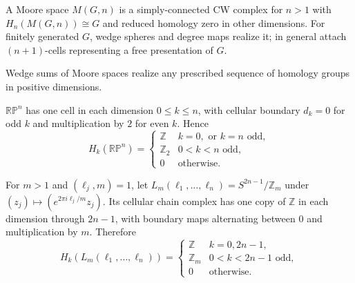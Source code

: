 \begin{example}
\label{ex:moore-spaces}

A Moore space $M(G,n)$ is a simply-connected CW complex for $n>1$ with $H_n(M(G,n))\cong G$ and reduced homology zero in other dimensions.  For finitely generated $G$, wedge spheres and degree maps realize it; in general attach $(n+1)$-cells representing a free presentation of $G$.
\end{example}

\begin{example}
\label{ex:cellular-homology-cpn}

Wedge sums of Moore spaces realize any prescribed sequence of homology groups in positive dimensions.
\end{example}

\begin{example}
\label{ex:cellular-homology-rpn}

$\mathbb{RP}^n$ has one cell in each dimension $0\leq k\leq n$, with cellular boundary $d_k=0$ for odd $k$ and multiplication by $2$ for even $k$.  Hence
\[
H_k(\mathbb{RP}^n)=\begin{cases}\mathbb{Z}&k=0,\text{ or }k=n\text{ odd},\\\mathbb{Z}_2&0<k<n\text{ odd},\\0&\text{otherwise}.\end{cases}
\]
\end{example}

\begin{example}
\label{ex:lens-spaces}

For $m>1$ and $(\ell_j,m)=1$, let $L_m(\ell_1,\ldots,\ell_n)=S^{2n-1}/\mathbb{Z}_m$ under $(z_j)\mapsto(e^{2\pi i\ell_j/m}z_j)$.  Its cellular chain complex has one copy of $\mathbb{Z}$ in each dimension through $2n-1$, with boundary maps alternating between $0$ and multiplication by $m$.  Therefore
\[
H_k(L_m(\ell_1,\ldots,\ell_n))=\begin{cases}\mathbb{Z}&k=0,2n-1,\\\mathbb{Z}_m&0<k<2n-1\text{ odd},\\0&\text{otherwise}.\end{cases}
\]
\end{example}

